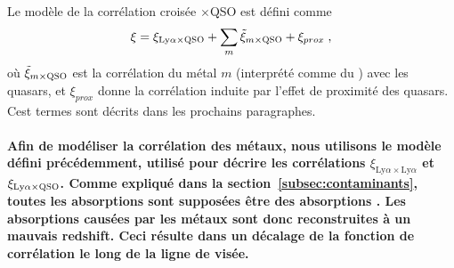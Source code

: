 \documentclass[11pt, twoside, a4paper, openright]{report}
\begin{document}
Le modèle de la corrélation croisée \lya{}$\times$QSO est défini comme
\begin{equation}
  \label{eq:xcf_model1}
  \xi = \xi_{\mathrm{Ly}\alpha\times \textsc{QSO}} + \sum_{m} \tilde \xi_{m \times \textsc{QSO}} + \xi_{prox} \; ,
\end{equation}
où $\tilde \xi_{m \times \textsc{QSO}}$ est la corrélation du métal $m$ (interprété comme du \lya{}) avec les quasars, et $\xi_{prox}$ donne la corrélation induite par l'effet de proximité des quasars. Cest termes sont décrits dans les prochains paragraphes.

\paragraph{}
\textbf{Afin de modéliser la corrélation des métaux, nous utilisons le modèle défini précédemment, utilisé pour décrire les corrélations $\xi_{\mathrm{Ly}\alpha\times\mathrm{Ly}\alpha}$ et $\xi_{\mathrm{Ly}\alpha\times\textsc{\textsc{QSO}}}$.
Comme expliqué dans la section~\ref{subsec:contaminants}, toutes les absorptions sont supposées être des absorptions \lya{}. Les absorptions causées par les métaux sont donc reconstruites à un mauvais redshift. Ceci résulte dans un décalage de la fonction de corrélation le long de la ligne de visée.
}
\end{document}
